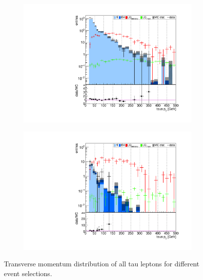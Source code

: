 \begin{figure}
\begin{subfigure}[t]{0.49\textwidth}
                \label{taupt:2b2tau}
                \end{subfigure}
                \begin{subfigure}[t]{0.49\textwidth}
                \includegraphics[width=\textwidth]{figures/plots/kinLQ75/tau_pT_2j1b_1tau.pdf}
                \label{taupt:1b1tau}
                \end{subfigure}
                \begin{subfigure}[t]{0.49\textwidth}
                \includegraphics[width=\textwidth]{figures/plots/kinLQ75/tau_pT_2j1b_2tau.pdf}
                \label{taupt:1b2tau}
                \end{subfigure}
\caption[Transverse momentum distribution of all tau leptons for different event selections.]{Transverse momentum distribution of all tau leptons for different event selections.}
\label{taupt}
\end{figure}
